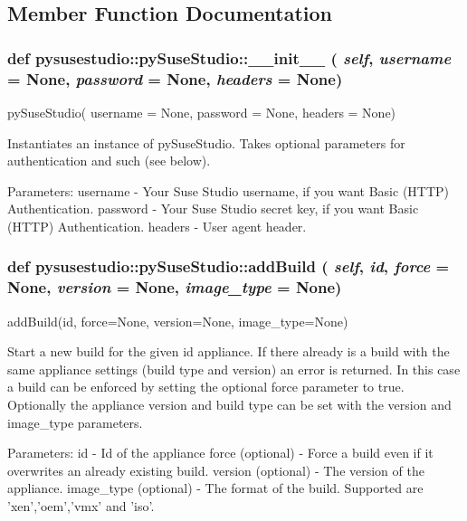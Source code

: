 \subsection{Member Function Documentation}
\hypertarget{classpysusestudio_1_1py_suse_studio_a8067ee791da6de5d42fa2954d6eff0ce}{
\subsubsection[{\_\-\_\-init\_\-\_\-}]{\setlength{\rightskip}{0pt plus 5cm}def pysusestudio::pySuseStudio::\_\-\_\-init\_\-\_\- ( {\em self}, \/   {\em username} = {\ttfamily None}, \/   {\em password} = {\ttfamily None}, \/   {\em headers} = {\ttfamily None})}}
\label{classpysusestudio_1_1py_suse_studio_a8067ee791da6de5d42fa2954d6eff0ce}
\begin{DoxyVerb}pySuseStudio( username = None, password = None, headers = None)

        Instantiates an instance of pySuseStudio. Takes optional parameters for authentication and such (see below).

        Parameters:
username - Your Suse Studio username, if you want Basic (HTTP) Authentication.
password - Your Suse Studio secret key, if you want Basic (HTTP) Authentication.
headers - User agent header.
\end{DoxyVerb}
 \hypertarget{classpysusestudio_1_1py_suse_studio_adf21425727a0efca0a8bd8aab4126ce0}{
\subsubsection[{addBuild}]{\setlength{\rightskip}{0pt plus 5cm}def pysusestudio::pySuseStudio::addBuild ( {\em self}, \/   {\em id}, \/   {\em force} = {\ttfamily None}, \/   {\em version} = {\ttfamily None}, \/   {\em image\_\-type} = {\ttfamily None})}}
\label{classpysusestudio_1_1py_suse_studio_adf21425727a0efca0a8bd8aab4126ce0}
\begin{DoxyVerb}addBuild(id, force=None, version=None, image_type=None)

            Start a new build for the given id appliance. 
            If there already is a build with the same appliance settings (build type and version) 
            an error is returned. In this case a build can be enforced by setting the optional 
            force parameter to true.
            Optionally the appliance version and build type can be set with the version and image_type parameters. 
            
            Parameters:
id - Id of the appliance
force (optional) - Force a build even if it overwrites an already existing build. 
version (optional) - The version of the appliance. 
image_type (optional) -  The format of the build. Supported are 'xen','oem','vmx' and 'iso'. 

\end{DoxyVerb}
